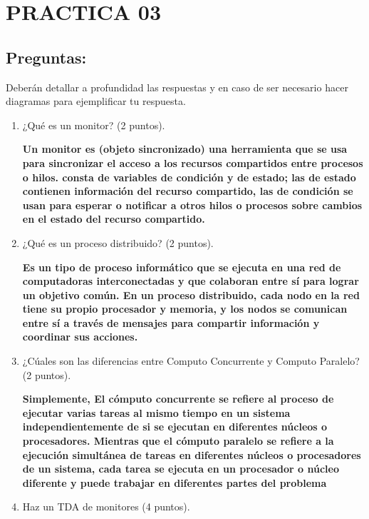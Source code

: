 \documentclass[12pt]{article}
\begin{document}

{\color{red} \section*{\textbf{PRACTICA 03}}}
\vspace{1em}

{\color{blue} \subsection*{\textbf{Preguntas:}}}


Deberán detallar a profundidad las respuestas y en caso de ser necesario hacer diagramas 
para ejemplificar tu respuesta.\\


\begin{enumerate}
    \item ¿Qué es un monitor? (2 puntos).
    \vspace{2mm}
    
    \textbf{Un monitor es (objeto sincronizado) una herramienta que se usa para sincronizar el acceso a los recursos compartidos entre procesos o hilos.
    consta de variables de condición y de estado; las de estado contienen información del recurso compartido, las de condición se usan para esperar o notificar
    a otros hilos o procesos sobre cambios en el estado del recurso compartido.}
    \item ¿Qué es un proceso distribuido? (2 puntos).
    \vspace{2mm}
    
    \textbf{Es un tipo de proceso informático que se ejecuta en una red de computadoras interconectadas y que colaboran entre sí 
    para lograr un objetivo común. En un proceso distribuido, cada nodo en la red tiene su propio procesador y memoria, y los nodos se 
    comunican entre sí a través de mensajes para compartir información y coordinar sus acciones.}
    \item ¿Cúales son las diferencias entre Computo Concurrente y Computo Paralelo? (2 puntos).
    \vspace{2mm}
    
    \textbf{Simplemente, El cómputo concurrente se refiere al proceso de ejecutar varias tareas al mismo tiempo en un sistema independientemente de si se ejecutan en diferentes núcleos o procesadores.
    Mientras que el cómputo paralelo se refiere a la ejecución simultánea de tareas en diferentes núcleos o procesadores de un sistema, cada tarea se ejecuta en un procesador o núcleo diferente y puede trabajar en diferentes partes del problema}
    \item Haz un TDA de monitores (4 puntos).
    \vspace{2mm}
    

\end{enumerate}
\end{document}
